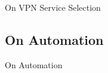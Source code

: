 \documentclass{beamer}
\begin{document}
\begin{frame}{On VPN Service Selection}
\end{frame}

\subsection{On Automation}

\begin{frame}{On Automation}
\end{frame}
\end{document}
